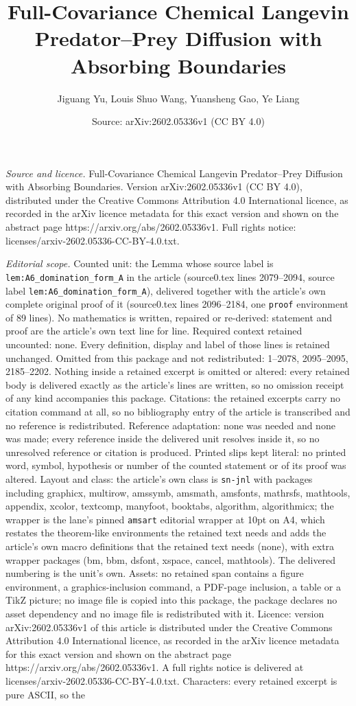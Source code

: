 \documentclass[10pt,a4paper]{amsart}
\title[Full-Covariance Chemical Langevin Predator--Prey Diffusion w]{Full-Covariance Chemical Langevin Predator--Prey Diffusion with Absorbing Boundaries}
\author{Jiguang Yu, Louis Shuo Wang, Yuansheng Gao, Ye Liang}
\date{Source: arXiv:2602.05336v1 (CC BY 4.0)}
\begin{document}
\maketitle

\noindent\emph{Source and licence.} Full-Covariance Chemical Langevin Predator--Prey Diffusion with Absorbing Boundaries. Version arXiv:2602.05336v1 (CC BY 4.0), distributed under the Creative Commons Attribution 4.0 International licence, as recorded in the arXiv licence metadata for this exact version and shown on the abstract page https://arxiv.org/abs/2602.05336v1. Full rights notice: licenses/arxiv-2602.05336-CC-BY-4.0.txt.\par\smallskip

\noindent\textit{Editorial scope.} Counted unit: the Lemma whose source label is \texttt{lem:A6\_domination\_form\_A} in the article (source0.tex lines 2079--2094, source label \texttt{lem:A6\_domination\_form\_A}), delivered together with the article's own complete original proof of it (source0.tex lines 2096--2184, one \texttt{proof} environment of 89 lines). No mathematics is written, repaired or re-derived: statement and proof are the article's own text line for line. Required context retained uncounted: none. Every definition, display and label of those lines is retained unchanged. Omitted from this package and not redistributed: 1--2078, 2095--2095, 2185--2202. Nothing inside a retained excerpt is omitted or altered: every retained body is delivered exactly as the article's lines are written, so no omission receipt of any kind accompanies this package. Citations: the retained excerpts carry no citation command at all, so no bibliography entry of the article is transcribed and no reference is redistributed. Reference adaptation: none was needed and none was made; every reference inside the delivered unit resolves inside it, so no unresolved reference or citation is produced. Printed slips kept literal: no printed word, symbol, hypothesis or number of the counted statement or of its proof was altered. Layout and class: the article's own class is \texttt{sn-jnl} with packages including graphicx, multirow, amssymb, amsmath, amsfonts, mathrsfs, mathtools, appendix, xcolor, textcomp, manyfoot, booktabs, algorithm, algorithmicx; the wrapper is the lane's pinned \texttt{amsart} editorial wrapper at 10pt on A4, which restates the theorem-like environments the retained text needs and adds the article's own macro definitions that the retained text needs (none), with extra wrapper packages (bm, bbm, dsfont, xspace, cancel, mathtools). The delivered numbering is the unit's own. Assets: no retained span contains a figure environment, a graphics-inclusion command, a PDF-page inclusion, a table or a TikZ picture; no image file is copied into this package, the package declares no asset dependency and no image file is redistributed with it. Licence: version arXiv:2602.05336v1 of this article is distributed under the Creative Commons Attribution 4.0 International licence, as recorded in the arXiv licence metadata for this exact version and shown on the abstract page https://arxiv.org/abs/2602.05336v1. A full rights notice is delivered at licenses/arxiv-2602.05336-CC-BY-4.0.txt. Characters: every retained excerpt is pure ASCII, so the 
\end{document}
